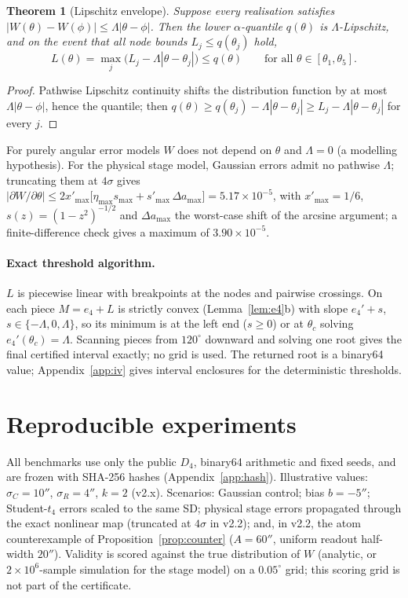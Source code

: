 \documentclass[11pt]{article}
\newtheorem{theorem}{Theorem}
\theoremstyle{definition}
\newcommand{\Dfour}{D_4}
\begin{document}
\begin{theorem}[Lipschitz envelope]\label{thm:lip}
Suppose every realisation satisfies $|W(\theta)-W(\phi)|\le\Lambda|\theta-\phi|$. Then the lower $\alpha$-quantile $q(\theta)$ is $\Lambda$-Lipschitz, and on the event that all node bounds $L_j\le q(\theta_j)$ hold,
\[
L(\theta)=\max_j\big(L_j-\Lambda|\theta-\theta_j|\big)\le q(\theta)\qquad\text{for all }\theta\in[\theta_1,\theta_5].
\]
\end{theorem}
\begin{proof}
Pathwise Lipschitz continuity shifts the distribution function by at most $\Lambda|\theta-\phi|$, hence the quantile; then $q(\theta)\ge q(\theta_j)-\Lambda|\theta-\theta_j|\ge L_j-\Lambda|\theta-\theta_j|$ for every $j$.
\end{proof}
For purely angular error models $W$ does not depend on $\theta$ and $\Lambda=0$ (a modelling hypothesis).
For the physical stage model, Gaussian errors admit no pathwise $\Lambda$; truncating them at $4\sigma$ gives $|\partial W/\partial\theta|\le2x'_{\max}\big[\eta_{\max}s_{\max}+s'_{\max}\,\Delta a_{\max}\big]=5.17\times10^{-5}$, with $x'_{\max}=1/6$, $s(z)=(1-z^2)^{-1/2}$ and $\Delta a_{\max}$ the worst-case shift of the arcsine argument; a finite-difference check gives a maximum of $3.90\times10^{-5}$.

\paragraph{Exact threshold algorithm.}
$L$ is piecewise linear with breakpoints at the nodes and pairwise crossings. On each piece $M=e_4+L$ is strictly convex (Lemma~\ref{lem:e4}b) with slope $e_4'+s$, $s\in\{-\Lambda,0,\Lambda\}$, so its minimum is at the left end ($s\ge0$) or at $\theta_c$ solving $e_4'(\theta_c)=\Lambda$.
Scanning pieces from $120^\circ$ downward and solving one root gives the final certified interval exactly; no grid is used. The returned root is a binary64 value; Appendix~\ref{app:iv} gives interval enclosures for the deterministic thresholds.

\section{Reproducible experiments}\label{sec:exp}
All benchmarks use only the public $\Dfour$, binary64 arithmetic and fixed seeds, and are frozen with SHA-256 hashes (Appendix~\ref{app:hash}).
Illustrative values: $\sigma_C=10''$, $\sigma_R=4''$, $k=2$ (v2.x).
Scenarios: Gaussian control; bias $b=-5''$; Student-$t_4$ errors scaled to the same SD; physical stage errors propagated through the exact nonlinear map (truncated at $4\sigma$ in v2.2); and, in v2.2, the atom counterexample of Proposition~\ref{prop:counter} ($A=60''$, uniform readout half-width $20''$).
Validity is scored against the true distribution of $W$ (analytic, or $2\times10^6$-sample simulation for the stage model) on a $0.05^\circ$ grid; this scoring grid is not part of the certificate.
\end{document}
